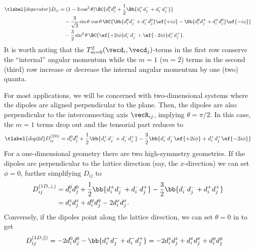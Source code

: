 \begin{align}\tlabel{doperator}
    D_{ij} &= (1-3\cos^2 \theta) \BC{ d_i^0 d_j^0 + \frac{1}{2}\Bb{d_i^+ d_j^- + d_i^- d_j^+} } \\
           &\quad -\frac{3}{\sqrt{2}}\sin\theta \,\cos\theta\, \BC{ \Bb{ d_i^0 d_j^- + d_i^- d_j^0 } \ef{+i\phi} - \Bb{ d_i^0 d_j^+ + d_i^+ d_j^0 } \ef{-i\phi} } \\
           &\quad -\frac{3}{2}\sin^2\theta \, \BC{ \ef{+2i\phi} d_i^- d_j^- + \ef{-2i\phi} d_i^+ d_j^+ }.
\end{align}
It is worth noting that the $T^2_{m=0}(\vecd_i, \vecd_j)$-terms in the first row conserve the ``internal'' angular momentum while the $m=1$ ($m=2$) terms in the second (third) row increase or decrease the internal angular momentum by one (two) quanta.

For most applications, we will be concerned with two-dimensional systems where the dipoles are aligned perpendicular to the plane. Then, the dipoles are also perpendicular to the interconnecting axis $\vecR_{ij}$, implying $\theta = \pi/2$. In this case, the $m=1$ terms drop out and the tensorial part reduces to
\begin{align} \tlabel{dop2d}
    D^\text{(2D)}_{ij} = d_i^0 d_j^0 + \frac{1}{2}\bb{d_i^+ d_j^- + d_i^- d_j^+} -\frac{3}{2} \bb{ d_i^- d_j^- \ef{+2i\phi} + d_i^+ d_j^+ \ef{-2i\phi} }
\end{align}
For a one-dimensional geometry there are two high-symmetry geometries. If the dipoles are perpendicular to the lattice direction (say, the $x$-direction) we can set $\phi=0$, further simplifying $D_{ij}$ to
\begin{align}
    D_{ij}^{(1D,\perp)} &= d_i^0 d_j^0 + \frac{1}{2}\bb{d_i^+ d_j^- + d_i^- d_j^+} -\frac{3}{2} \bb{d_i^- d_j^- + d_i^+ d_j^+} \\
 &= d_i^z d_j^z + d_i^y d_j^y - 2 d_i^x d_j^x.
\end{align}
Conversely, if the dipoles point along the lattice direction, we can set $\theta=0$ in  to get
\begin{align}
    D^{(1D,\parallel)}_{ij} &= -2 d_i^0 d_j^0 - \bb{d_i^+ d_j^- + d_i^- d_j^+} = -2 d_i^z d_j^z+ d_i^x d_j^x + d_i^y d_j^y
\end{align}

